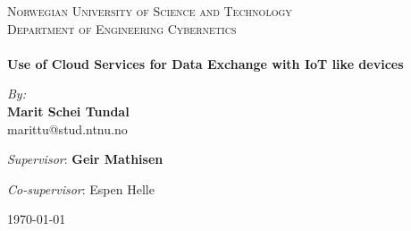 
\begin{center}

\textsc{\LARGE Norwegian University of Science and Technology}\\[0.8cm] 
\textsc{\Large Department of Engineering Cybernetics}\\[0.6cm]

\HRule \\[0.4cm]
{ \huge \bfseries Use of Cloud Services for Data Exchange with IoT like devices}
\HRule \\[1.5cm]

\begin{center} \large
\emph{By:}\\
\textbf{Marit Schei Tundal}\\
marittu@stud.ntnu.no
\end{center}

\begin{center}\large
\emph{Supervisor}: \textbf{Geir Mathisen}
\end{center}
\begin{center}
\emph{Co-supervisor}: Espen Helle
\end{center}

\vfill

\begin{figure}[!h]
    \centering
\end{figure}

\vfill

{\large \monthyear\today}

\end{center}
\newpage
